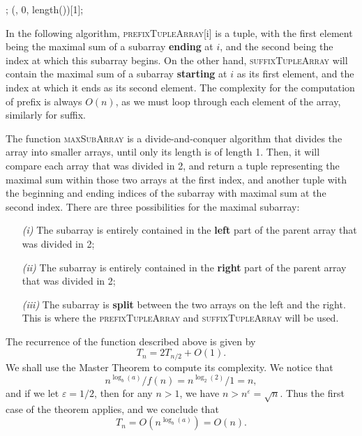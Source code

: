 \documentclass[12pt]{article}
\theoremstyle{definition}
\theoremstyle{remark}
\begin{document}
\begin{enumerate}
\begin{algorithm}
{  \Return \maxTuple;
  }
\BlankLine 
  \Return \maxsubarray (\arr, 0, length(\arr))[1];\\

\end{algorithm}
\DecMargin{1em}



In the following algorithm, \textsc{prefixTupleArray}[i] is a tuple, with the first element being the maximal sum of a subarray \textbf{ending} at $i$, and the second being the index at which this subarray begins. On the other hand, \textsc{suffixTupleArray} will contain the maximal sum of a subarray \textbf{starting} at $i$ as its first element, and the index at which it ends as its second element. The complexity for the computation of prefix is always $O(n)$, as we must loop through each element of the array, similarly for suffix. 

The function \textsc{maxSubArray} is a divide-and-conquer algorithm that divides the array into smaller arrays, until only its length is of length 1. Then, it will compare each array that was divided in 2, and return a tuple representing the maximal sum within those two arrays at the first index, and another tuple with the beginning and ending indices of the subarray with maximal sum at the second index. There are three possibilities for the maximal subarray: 
\begin{enumerate}
  \item[\it (i)] The subarray is entirely contained in the \textbf{left} part of the parent array that was divided in 2;
  \item[\it (ii)] The subarray is entirely contained in the \textbf{right} part of the parent array that was divided in 2;
  \item[\it (iii)] The subarray is \textbf{split} between the two arrays on the left and the right. This is where the  \textsc{prefixTupleArray} and \textsc{suffixTupleArray} will be used. 
\end{enumerate}
The recurrence of the function described above is given by 
$$T_n = 2T_{n/2} + O(1). $$
We shall use the Master Theorem to compute its complexity. We notice that 
$$n^{\log_b (a)} / f(n) = n^{\log_2(2)}/1 = n, $$
and if we let $\varepsilon = 1/2$, then for any $n > 1$, we have $n > n^\varepsilon = \sqrt{n} {}$. Thus the first case of the theorem applies, and we conclude that
$$T_n = O(n^{\log_b (a)}) = O(n) .$$

\end{enumerate}
\end{document}
